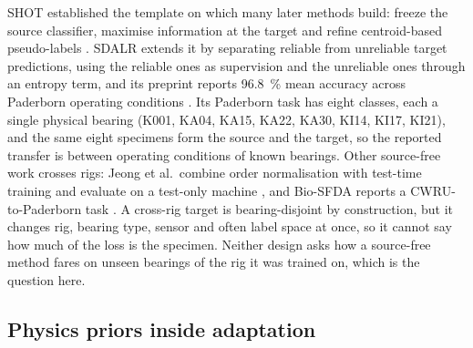 SHOT established the template on which many later methods build: freeze the source classifier, maximise information at the
target and refine centroid-based pseudo-labels \cite{liang2020shot}. SDALR extends it by separating reliable from unreliable
target predictions, using the reliable ones as supervision and the unreliable ones through an entropy term, and its preprint reports
\SI{96.8}{\percent} mean accuracy across Paderborn operating conditions \cite{sdalr2025}. Its Paderborn task has eight
classes, each a single physical bearing (K001, KA04, KA15, KA22, KA30, KI14, KI17, KI21), and the same eight specimens form
the source and the target, so the reported transfer is between operating conditions of known bearings. Other source-free
work crosses rigs: Jeong et al.\ combine order normalisation with test-time training and evaluate on a test-only machine
\cite{jeong2025}, and Bio-SFDA reports a CWRU-to-Paderborn task \cite{yoon2026biosfda}. A cross-rig target is
bearing-disjoint by construction, but it changes rig, bearing type, sensor and often label space at once, so it cannot say
how much of the loss is the specimen. Neither design asks how a source-free method fares on unseen bearings of the rig it
was trained on, which is the question here.

\subsection{Physics priors inside adaptation}

